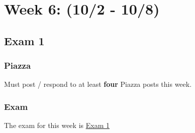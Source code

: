 \clearpage
\chapter{Week 6: (10/2 - 10/8)}

\section{Exam 1}

\subsection{Piazza}

Must post / respond to at least \textbf{four} Piazza posts this week.  

\subsection{Exam}

The exam for this week is \href{https://applied.cs.colorado.edu/mod/quiz/view.php?id=50729}{Exam 1}  